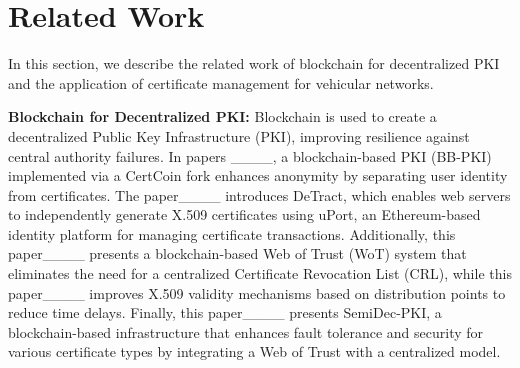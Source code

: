 \section{Related Work}
\label{rw}
In this section, we describe the related work of blockchain for decentralized PKI and the application of certificate management for vehicular networks.

\textbf{Blockchain for Decentralized PKI:} Blockchain is used to create a decentralized Public Key Infrastructure (PKI), improving resilience against central authority failures. In papers ____, a blockchain-based PKI (BB-PKI) implemented via a CertCoin fork enhances anonymity by separating user identity from certificates. The paper____ introduces DeTract, which enables web servers to independently generate X.509 certificates using uPort, an Ethereum-based identity platform for managing certificate transactions. Additionally, this paper____ presents a blockchain-based Web of Trust (WoT) system that eliminates the need for a centralized Certificate Revocation List (CRL), while this paper____ improves X.509 validity mechanisms based on distribution points to reduce time delays. Finally, this paper____ presents SemiDec-PKI, a blockchain-based infrastructure that enhances fault tolerance and security for various certificate types by integrating a Web of Trust with a centralized model.



